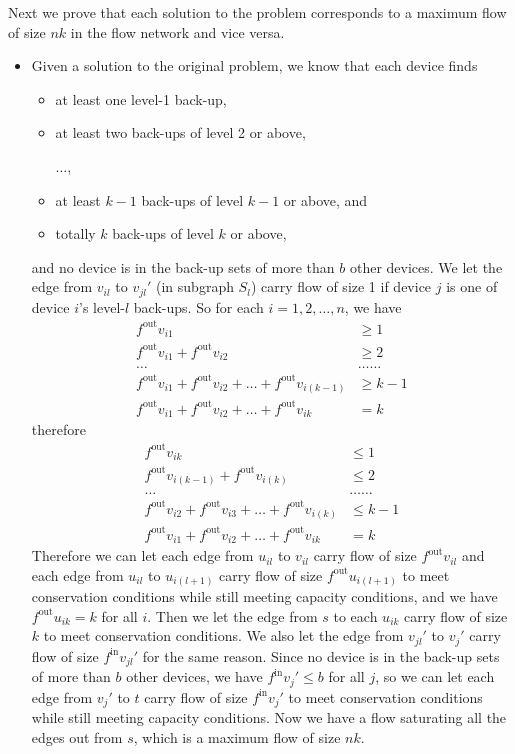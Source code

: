 \documentclass[12pt,letterpaper]{article}
\begin{document}
Next we prove that each solution to the problem corresponds to a maximum flow of size $nk$ in the flow network and vice versa.

\begin{itemize}
\item Given a solution to the original problem, we know that each device finds 
\begin{itemize}
\item at least one level-1 back-up, 
\item at least two back-ups of level 2 or above, 

$\dots$, 

\item at least $k-1$ back-ups of level $k-1$ or above, and 
\item totally $k$ back-ups of level $k$ or above, 
\end{itemize}
and no device is in the back-up sets of more than $b$ other devices. We let the edge from $v_{il}$ to $v_{jl}'$ (in subgraph $S_l$) carry flow of size 1 if device $j$ is one of device $i$'s level-$l$ back-ups. So for each $i=1,2,\dots,n$, we have
\begin{align}
\nonumber f^{\textrm{out}}v_{i1} & \ge 1\\\nonumber
f^{\textrm{out}}v_{i1}+f^{\textrm{out}}v_{i2} & \ge 2\\\nonumber
\dots & \dots \dots \\\nonumber
f^{\textrm{out}}v_{i1}+f^{\textrm{out}}v_{i2}+\dots+f^{\textrm{out}}v_{i(k-1)} & \ge k-1\\\nonumber
f^{\textrm{out}}v_{i1}+f^{\textrm{out}}v_{i2}+\dots+f^{\textrm{out}}v_{ik} & = k
\end{align}
therefore 
\begin{align}
\nonumber f^{\textrm{out}}v_{ik} & \le 1\\\nonumber
f^{\textrm{out}}v_{i(k-1)} + f^{\textrm{out}}v_{i(k)}& \le 2\\\nonumber
\dots & \dots \dots\\\nonumber
f^{\textrm{out}}v_{i2} + f^{\textrm{out}}v_{i3} + \dots + f^{\textrm{out}}v_{i(k)} & \le k-1\\\nonumber
f^{\textrm{out}}v_{i1}+f^{\textrm{out}}v_{i2}+\dots+f^{\textrm{out}}v_{ik} & = k
\end{align}
Therefore we can let each edge from $u_{il}$ to $v_{il}$ carry flow of size $f^{\textrm{out}}v_{il}$ and each edge from $u_{il}$ to $u_{i(l+1)}$ carry flow of size $f^{\textrm{out}}u_{i(l+1)}$ to meet conservation conditions while still meeting capacity conditions, and we have $f^{\textrm{out}}u_{ik} = k$ for all $i$. Then we let the edge from $s$ to each $u_{ik}$ carry flow of size $k$ to meet conservation conditions. We also let the edge from $v_{jl}'$ to $v_j'$ carry flow of size $f^{\textrm{in}}v_{jl}'$ for the same reason. Since no device is in the back-up sets of more than $b$ other devices, we have $f^{\textrm{in}}v_{j}' \le b$ for all $j$, so we can let each edge from  $v_j'$ to $t$ carry flow of size $f^{\textrm{in}}v_{j}'$ to meet conservation conditions while still meeting capacity conditions. Now we have a flow saturating all the edges out from $s$, which is a maximum flow of size $nk$.

\end{itemize}
\end{document}
